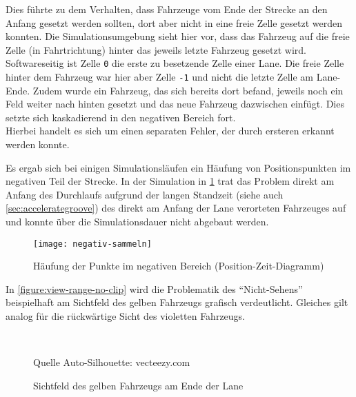 Dies führte zu dem Verhalten, dass Fahrzeuge vom Ende der Strecke an den Anfang gesetzt werden sollten, dort aber nicht in eine freie Zelle gesetzt werden konnten.
Die Simulationsumgebung sieht hier vor, dass das Fahrzeug auf die freie Zelle (in Fahrtrichtung) hinter das jeweils letzte Fahrzeug gesetzt wird.
\\
Softwareseitig ist Zelle \texttt{0} die erste zu besetzende Zelle einer Lane. Die freie Zelle hinter dem Fahrzeug war hier aber Zelle \texttt{-1} und nicht die letzte Zelle am Lane-Ende.
Zudem wurde ein Fahrzeug, das sich bereits dort befand, jeweils noch ein Feld weiter nach hinten gesetzt und das neue Fahrzeug dazwischen einfügt.
Dies setzte sich kaskadierend in den negativen Bereich fort.
\\
Hierbei handelt es sich um einen separaten Fehler, der durch ersteren erkannt werden konnte.

Es ergab sich bei einigen Simulationsläufen ein Häufung von Positionspunkten im negativen Teil der Strecke.
In der Simulation in \cref{figure:negativ-sammeln} trat das Problem direkt am Anfang des Durchlaufs aufgrund der langen Standzeit (siehe auch \cref{sec:accelerategroove}) des direkt am Anfang der Lane verorteten Fahrzeuges auf und konnte über die Simulationsdauer nicht abgebaut werden.
\begin{figure}[hptb]
 \centering
 \texttt{[image: negativ-sammeln]}
 \caption[Punktehäufung im negativen Bereich]
 		 {Häufung der Punkte im negativen Bereich (Position-Zeit-Diagramm)}
 \label{figure:negativ-sammeln}
\end{figure} 

In \cref{figure:view-range-no-clip} wird die Problematik des \enquote{Nicht-Sehens} beispielhaft am Sichtfeld des gelben Fahrzeugs grafisch verdeutlicht. 
Gleiches gilt analog für die rückwärtige Sicht des violetten Fahrzeugs.

\begin{figure}[hptb]
  \centering
     \\
  \caption[Umbrechen des Sichtfelds eines Fahrzeugs am Ende der Lane]
          {Sichtfeld des gelben Fahrzeugs am Ende der Lane}
          {\footnotesize Quelle Auto-Silhouette: vecteezy.com}
  \label{figure:view-range-no-clip-clip}
\end{figure}

